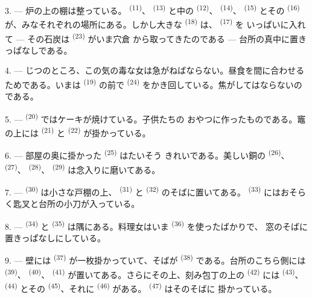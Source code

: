 3. --- 炉の上の棚は整っている。 \textsuperscript{(11)}、
 \textsuperscript{(13)} と中の \textsuperscript{(12)}、
 \textsuperscript{(14)}、 \textsuperscript{(15)} とその
 \textsuperscript{(16)} が、みなそれぞれの場所にある。しかし大きな
 \textsuperscript{(18)} は、 \textsuperscript{(17)} を
いっぱいに入れて --- その石炭は \textsuperscript{(23)} がいま穴倉
から取ってきたのである --- 台所の真中に置きっぱなしである。

4. --- じつのところ、この気の毒な女は急がねばならない。昼食を間に合わせる
ためである。いまは \textsuperscript{(19)} の前で
\textsuperscript{(24)} をかき回している。焦がしてはならないのである。

5. ---  \textsuperscript{(20)} ではケーキが焼けている。子供たちの
おやつに作ったものである。竈の上には \textsuperscript{(21)} と
 \textsuperscript{(22)} が掛かっている。

\VUsaut{4.0mm}
\VUsaut{3.0mm}

6. --- 部屋の奥に掛かった \textsuperscript{(25)} はたいそう
きれいである。美しい銅の \textsuperscript{(26)}、
\textsuperscript{(27)}、 \textsuperscript{(28)}、
\textsuperscript{(29)} は念入りに磨いてある。

7. ---  \textsuperscript{(30)} は小さな戸棚の上、
\textsuperscript{(31)} と \textsuperscript{(32)} のそばに置いてある。
 \textsuperscript{(33)} にはおそらく匙叉と台所の小刀が入っている。

8. ---  \textsuperscript{(34)} と \textsuperscript{(35)}
は隅にある。料理女はいま \textsuperscript{(36)} を使ったばかりで、
窓のそばに置きっぱなしにしている。

9. --- 壁には \textsuperscript{(37)} が一枚掛かっていて、そばが
 \textsuperscript{(38)} である。台所のこちら側には
\textsuperscript{(39)}、 \textsuperscript{(40)}、
\textsuperscript{(41)} が置いてある。さらにその上、刻み包丁の上の
\textsuperscript{(42)} には \textsuperscript{(43)}、
\textsuperscript{(44)} とその \textsuperscript{(45)}、それに
\textsuperscript{(46)} がある。 \textsuperscript{(47)} はそのそばに
掛かっている。

